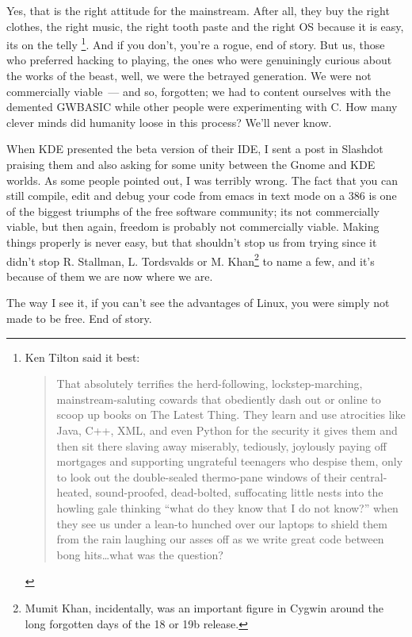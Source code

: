 \documentclass{book}
\begin{document}
Yes, that is the right attitude for the mainstream. After all, they
buy the right clothes, the right music, the right tooth paste and the
right OS because it is easy, its on the telly
\footnote{Ken Tilton said it best:
  \begin{quote}
    That absolutely terrifies the herd-following, lockstep-marching,
    mainstream-saluting cowards that obediently dash out or online to
    scoop up books on The Latest Thing. They learn and use atrocities
    like Java, C++, XML, and even Python for the security it gives
    them and then sit there slaving away miserably, tediously,
    joylously paying off mortgages and supporting ungrateful teenagers
    who despise them, only to look out the double-sealed thermo-pane
    windows of their central-heated, sound-proofed, dead-bolted,
    suffocating little nests into the howling gale thinking ``what do
    they know that I do not know?'' when they see us under a lean-to
    hunched over our laptops to shield them from the rain laughing our
    asses off as we write great code between bong hits\ldots what was
    the question?
  \end{quote}
}. And if you don't, you're a rogue, end of story. But us, those who
preferred hacking to playing, the ones who were genuiningly curious
about the works of the beast, well, we were the betrayed
generation. We were not commercially viable~--- and so, forgotten; we
had to content ourselves with the demented GWBASIC while other people
were experimenting with C. How many clever minds did humanity loose in
this process? We'll never know.

When KDE presented the beta version of their IDE, I sent a post in
Slashdot praising them and also asking for some unity between the
Gnome and KDE worlds. As some people pointed out, I was terribly
wrong. The fact that you can still compile, edit and debug your code
from emacs in text mode on a 386 is one of the biggest triumphs of the
free software community; its not commercially viable, but then again,
freedom is probably not commercially viable. Making things properly is
never easy, but that shouldn't stop us from trying since it didn't
stop R. Stallman, L. Tordsvalds or M. Khan\footnote{Mumit Khan,
  incidentally, was an important figure in Cygwin around the long
  forgotten days of the 18 or 19b release.} to name a few, and it's
because of them we are now where we are.

The way I see it, if you can't see the advantages of Linux, you were
simply not made to be free. End of story.
\end{document}

